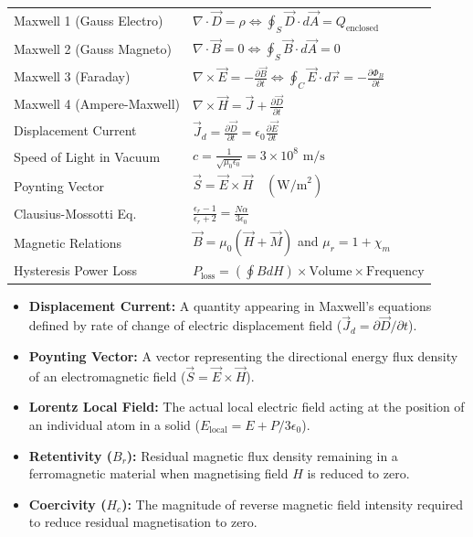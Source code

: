 \documentclass[12pt,a4paper]{article}
\renewcommand{\arraystretch}{1.45}
\begin{document}
\begin{tcolorbox}[formulabox, title={\textbf{Key Formulas and Metrics at a Glance}}]
\renewcommand{\arraystretch}{1.35}
\begin{tabularx}{\linewidth}{B{5.0cm} X}
Maxwell 1 (Gauss Electro) & $\nabla \cdot \vec{D} = \rho \iff \oint_S \vec{D} \cdot d\vec{A} = Q_{\text{enclosed}}$ \\[4pt]
Maxwell 2 (Gauss Magneto) & $\nabla \cdot \vec{B} = 0 \iff \oint_S \vec{B} \cdot d\vec{A} = 0$ \\[4pt]
Maxwell 3 (Faraday) & $\nabla \times \vec{E} = -\frac{\partial \vec{B}}{\partial t} \iff \oint_C \vec{E} \cdot d\vec{r} = -\frac{\partial\Phi_B}{\partial t}$ \\[4pt]
Maxwell 4 (Ampere-Maxwell) & $\nabla \times \vec{H} = \vec{J} + \frac{\partial \vec{D}}{\partial t}$ \\[4pt]
Displacement Current & $\vec{J}_d = \frac{\partial \vec{D}}{\partial t} = \epsilon_0 \frac{\partial \vec{E}}{\partial t}$ \\[4pt]
Speed of Light in Vacuum & $c = \frac{1}{\sqrt{\mu_0 \epsilon_0}} = 3 \times 10^8\text{ m/s}$ \\[4pt]
Poynting Vector & $\vec{S} = \vec{E} \times \vec{H} \quad (\text{W/m}^2)$ \\[4pt]
Clausius-Mossotti Eq. & $\frac{\epsilon_r - 1}{\epsilon_r + 2} = \frac{N \alpha}{3 \epsilon_0}$ \\[4pt]
Magnetic Relations & $\vec{B} = \mu_0(\vec{H} + \vec{M})$ \quad and \quad $\mu_r = 1 + \chi_m$ \\[4pt]
Hysteresis Power Loss & $P_{\text{loss}} = (\oint B dH) \times \text{Volume} \times \text{Frequency}$ \\[4pt]
\end{tabularx}
\end{tcolorbox}

\begin{tcolorbox}[defbox, title={\textbf{One-Line Definitions}}]
\begin{itemize}[leftmargin=*, itemsep=2pt]
  \item \textbf{Displacement Current:} A quantity appearing in Maxwell's equations defined by rate of change of electric displacement field ($\vec{J}_d = \partial\vec{D}/\partial t$).
  \item \textbf{Poynting Vector:} A vector representing the directional energy flux density of an electromagnetic field ($\vec{S} = \vec{E} \times \vec{H}$).
  \item \textbf{Lorentz Local Field:} The actual local electric field acting at the position of an individual atom in a solid ($E_{\text{local}} = E + P/3\epsilon_0$).
  \item \textbf{Retentivity ($B_r$):} Residual magnetic flux density remaining in a ferromagnetic material when magnetising field $H$ is reduced to zero.
  \item \textbf{Coercivity ($H_c$):} The magnitude of reverse magnetic field intensity required to reduce residual magnetisation to zero.
\end{itemize}
\end{tcolorbox}
\end{document}
